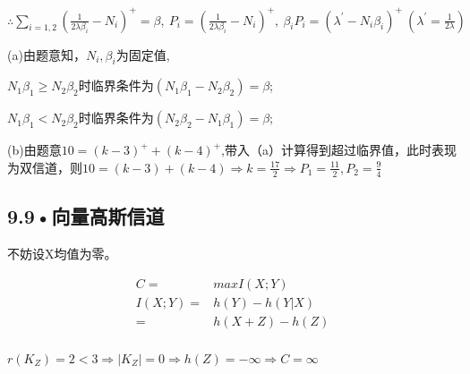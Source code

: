 \documentclass[UTF8]{ctexart}
\begin{document}
$\therefore \sum_{i=1,2}(\frac{1}{2\lambda\beta_i}-N_i)^+=\beta,\ P_i = (\frac{1}{2\lambda\beta_i}-N_i)^+,\ \beta_iP_i=(\lambda^\prime - N_i\beta_i)^+\ (\lambda ^\prime = \frac{1}{2\lambda})$

(a)由题意知，$N_i, \beta_i$为固定值,

$N_1\beta_1\geqslant N_2\beta_2 $时临界条件为$(N_1\beta_1 - N_2\beta_2) = \beta$;

$N_1\beta_1< N_2\beta_2 $时临界条件为$(N_2\beta_2 - N_1\beta_1) = \beta$;


(b)由题意$10 = (k-3)^++(k-4)^+$,带入（a）计算得到超过临界值，此时表现为双信道，则$10 = (k-3)+(k-4)\Rightarrow k=\frac{17}{2}\Rightarrow  P_1=\frac{11}{2}, P_2 = \frac{9}{4}$
\subsection*{9.9•向量高斯信道}
不妨设X均值为零。

\begin{equation*}
    \begin{split}
        C =& max I(X;Y)\\
        I(X;Y)=&h(Y)-h(Y|X)\\
        =& h(X+Z)-h(Z)\\
    \end{split}
\end{equation*}

$r(K_Z)=2<3\Rightarrow |K_Z|=0\Rightarrow h(Z)=-\infty\Rightarrow C=\infty$
\end{document}

